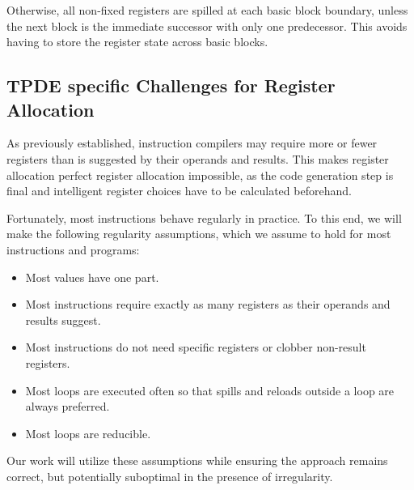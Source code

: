 Otherwise, all non-fixed registers are spilled at each basic block boundary, unless the next block is the immediate successor with only one predecessor. This avoids having to store the register state across basic blocks.

\subsection{TPDE specific Challenges for Register Allocation}

As previously established, instruction compilers may require more or fewer registers than is suggested by their operands and results. This makes register allocation perfect register allocation impossible, as the code generation step is final and intelligent register choices have to be calculated beforehand. 

Fortunately, most instructions behave regularly in practice.
To this end, we will make the following regularity assumptions, which we assume to hold for most instructions and programs:


\begin{itemize}
    \item Most values have one part.
    \item Most instructions require exactly as many registers as their operands and results suggest.
    \item Most instructions do not need specific registers or clobber non-result registers.
    \item Most loops are executed often so that spills and reloads outside a loop are always preferred.
    \item Most loops are reducible.
\end{itemize}

Our work will utilize these assumptions while ensuring the approach remains correct, but potentially suboptimal in the presence of irregularity.